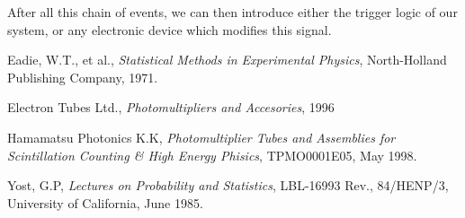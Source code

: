 \documentclass{article}
\begin{document}
After all this chain of events, we can then introduce either the
trigger logic of our system, or any electronic device which modifies
this signal.

\begin{thebibliography}{99}
  
 Eadie, W.T., et al., \emph{Statistical Methods in
    Experimental Physics}, North-Holland Publishing Company, 1971.
  
 Electron Tubes Ltd., \emph{Photomultipliers and
    Accesories}, 1996

 Hamamatsu Photonics K.K, \emph{Photomultiplier
    Tubes and Assemblies for Scintillation Counting \& High Energy
    Phisics}, TPMO0001E05, May 1998.

 Yost, G.P, \emph{Lectures on Probability and
    Statistics}, LBL-16993 Rev., 84/HENP/3, University of California,
    June 1985.

\end{thebibliography}
\end{document}
